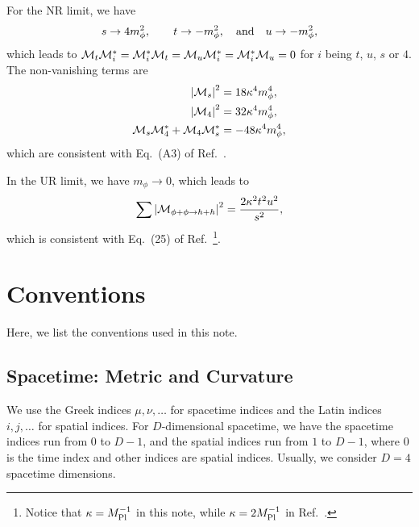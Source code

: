 \documentclass{article}
\begin{document}
            For the NR limit, we have
            \begin{equation}
                s \to 4 m_\phi^2, \qquad t \to -m_\phi^2, \qand u \to -m_\phi^2,
            \end{equation}
            which leads to $\mathcal{M}_t \mathcal{M}_i^* = \mathcal{M}_i^* \mathcal{M}_t = \mathcal{M}_u \mathcal{M}_i^* = \mathcal{M}_i^* \mathcal{M}_u = 0$ for $i$ being $t$, $u$, $s$ or $4$.
            The non-vanishing terms are
            \begin{align}
                \Msqr[s] & = 18 \kappa^4 m_\phi^4, \\
                \Msqr[4] & = 32 \kappa^4 m_\phi^4, \\
                \calM_s \calM_4^* + \calM_4 \calM_s^* & = -48 \kappa^4 m_\phi^4,
            \end{align}
            which are consistent with Eq.~(A3) of Ref.~\cite{Choi:2024ilx}.

            In the UR limit, we have $m_\phi \to 0$, which leads to
            \begin{equation}
                \sumMsqr[\phi + \phi \to h + h] = \frac{2 \kappa^2 t^2 u^2}{s^2},
            \end{equation}
            which is consistent with Eq.~(25) of Ref.~\cite{Ghiglieri:2022rfp}\footnote{Notice that $\kappa = M_\mathrm{Pl}^{-1}$ in this note, while $\kappa = 2 M_\mathrm{Pl}^{-1}$ in Ref.~\cite{Ghiglieri:2022rfp}.}.
    
    \clearpage
    \appendix

    \section{Conventions}\label{app:convention}

        Here, we list the conventions used in this note.

        \subsection{Spacetime: Metric and Curvature}
        
            We use the Greek indices $\mu, \nu, \ldots$ for spacetime indices and the Latin indices $i, j, \ldots$ for spatial indices.
            For $D$-dimensional spacetime, we have the spacetime indices run from $0$ to $D - 1$, and the spatial indices run from $1$ to $D - 1$, where $0$ is the time index and other indices are spatial indices.
            Usually, we consider $D = 4$ spacetime dimensions.
\end{document}
